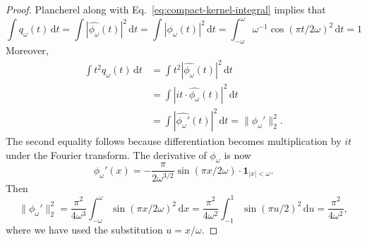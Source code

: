 \documentclass[10pt]{article}
\newcommand{\angelos}[1]{{\color{blue}[angelos: #1]}}
\renewcommand{\angelos}[1]{}
\begin{document}
\begin{proof}
    Plancherel along with Eq.~\eqref{eq:compact-kernel-integral} implies that
    \begin{equation*}
        \int q_\omega(t)\,\mathrm{d}t
        = \int |\widehat{\phi_{\omega}}(t)|^2\,\mathrm{d}t
        = \int |\phi_{\omega}(t)|^2\,\mathrm{d}t
        = \int_{-\omega}^{\omega} \omega^{-1} \cos(\pi t/2\omega)^2\,\mathrm{d}t
        = 1
    \end{equation*}
    Moreover,
    \begin{align}
        \int t^2 q_\omega(t)\,\mathrm{d}t
        &= \int t^2 |\widehat{\phi_\omega}(t)|^2\,\mathrm{d}t \\
        &= \int |it \cdot \widehat{\phi_\omega}(t)|^2\,\mathrm{d}t \\
        &= \int |\widehat{\phi_\omega'}(t)|^2\,\mathrm{d}t 
        = \|\phi_{\omega}'\|_2^2.
    \end{align}
    The second equality follows because differentiation becomes multiplication by $it$ under the Fourier transform. The derivative of $\phi_{\omega}$ is now \angelos{it says weak derivative, ChatGPT says that it is valid}
    \begin{equation*}
        \phi_{\omega}'(x) = -\frac{\pi}{2\omega^{3/2}}\sin(\pi x/2\omega) \cdot \mathbf{1}_{|x| < \omega}.
    \end{equation*}
    Then
    \begin{equation*}
        \|\phi_{\omega}'\|_2^2
        = \frac{\pi^2}{4\omega^{3}} \int_{-\omega}^{\omega} \sin(\pi x/2\omega)^2 \, \mathrm{d}x
        = \frac{\pi^2}{4\omega^{2}} \int_{-1}^{1} \sin(\pi u/2)^2 \, \mathrm{d}u
        = \frac{\pi^2}{4\omega^2},
    \end{equation*}
    where we have used the substitution $u = x/\omega$.
\end{proof}
\end{document}
